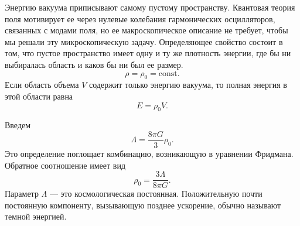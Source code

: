 Энергию вакуума приписывают самому пустому пространству. Квантовая теория поля мотивирует ее через нулевые колебания гармонических осцилляторов, связанных с модами поля, но ее макроскопическое описание не требует, чтобы мы решали эту микроскопическую задачу. Определяющее свойство состоит в том, что пустое пространство имеет одну и ту же плотность энергии, где бы ни выбиралась область и каков бы ни был ее размер.
\begin{equation}
\rho=\rho_0=\text{const.}
\label{eq:c05-vacuum-density}
\end{equation}
Если область объема \(V\) содержит только энергию вакуума, то полная энергия в этой области равна
\begin{equation}
E=\rho_0 V.
\end{equation}
\begin{classroomqa}
\end{classroomqa}

Введем
\begin{equation}
\Lambda=\frac{8\pi G}{3}\rho_0.
\label{eq:c05-lambda-definition}
\end{equation}
Это определение поглощает комбинацию, возникающую в уравнении Фридмана. Обратное соотношение имеет вид
\begin{equation}
\rho_0=\frac{3\Lambda}{8\pi G}.
\end{equation}
Параметр \(\Lambda\) — это космологическая постоянная. Положительную почти постоянную компоненту, вызывающую позднее ускорение, обычно называют темной энергией.

